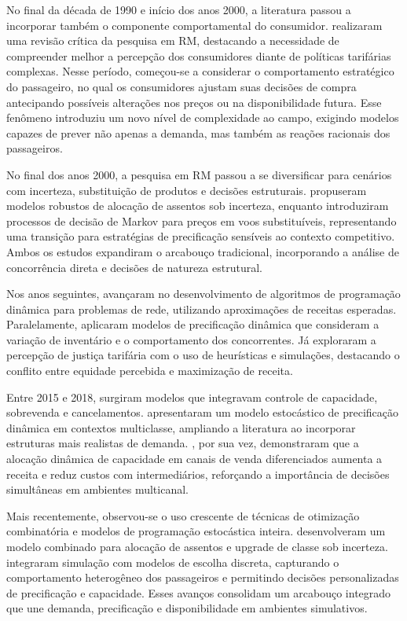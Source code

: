 No final da década de 1990 e início dos anos 2000, a literatura passou a incorporar também o componente comportamental do consumidor. \citet{McGill_Ryzin1999} realizaram uma revisão crítica da pesquisa em RM, destacando a necessidade de compreender melhor a percepção dos consumidores diante de políticas tarifárias complexas. Nesse período, começou-se a considerar o comportamento estratégico do passageiro, no qual os consumidores ajustam suas decisões de compra antecipando possíveis alterações nos preços ou na disponibilidade futura. Esse fenômeno introduziu um novo nível de complexidade ao campo, exigindo modelos capazes de prever não apenas a demanda, mas também as reações racionais dos passageiros.

No final dos anos 2000, a pesquisa em RM passou a se diversificar para cenários com incerteza, substituição de produtos e decisões estruturais. \citet{Birbil2009} propuseram modelos robustos de alocação de assentos sob incerteza, enquanto \citet{ZHANG2009848} introduziram processos de decisão de Markov para preços em voos substituíveis, representando uma transição para estratégias de precificação sensíveis ao contexto competitivo. Ambos os estudos expandiram o arcabouço tradicional, incorporando a análise de concorrência direta e decisões de natureza estrutural.

Nos anos seguintes, \citet{HUANG2011333} avançaram no desenvolvimento de algoritmos de programação dinâmica para problemas de rede, utilizando aproximações de receitas esperadas. Paralelamente, \citet{Rusdiansyah_Dwi} aplicaram modelos de precificação dinâmica que consideram a variação de inventário e o comportamento dos concorrentes. Já \citet{ASLANI201456} exploraram a percepção de justiça tarifária com o uso de heurísticas e simulações, destacando o conflito entre equidade percebida e maximização de receita.

Entre 2015 e 2018, surgiram modelos que integravam controle de capacidade, sobrevenda e cancelamentos. \citet{OTERO2015188} apresentaram um modelo estocástico de precificação dinâmica em contextos multiclasse, ampliando a literatura ao incorporar estruturas mais realistas de demanda. \citet{WANG2018173}, por sua vez, demonstraram que a alocação dinâmica de capacidade em canais de venda diferenciados aumenta a receita e reduz custos com intermediários, reforçando a importância de decisões simultâneas em ambientes multicanal.

Mais recentemente, observou-se o uso crescente de técnicas de otimização combinatória e modelos de programação estocástica inteira. \citet{LI2022100054} desenvolveram um modelo combinado para alocação de assentos e upgrade de classe sob incerteza. \citet{FUKUSHI2022297} integraram simulação com modelos de escolha discreta, capturando o comportamento heterogêneo dos passageiros e permitindo decisões personalizadas de precificação e capacidade. Esses avanços consolidam um arcabouço integrado que une demanda, precificação e disponibilidade em ambientes simulativos.

